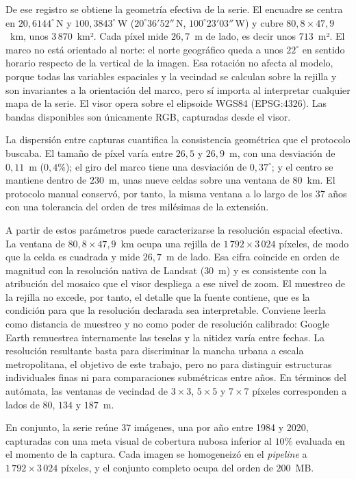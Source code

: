 De ese registro se obtiene la geometría efectiva de la serie. El encuadre se centra en $20{,}6144^\circ$\,N y $100{,}3843^\circ$\,W ($20^\circ 36' 52''$\,N, $100^\circ 23' 03''$\,W) y cubre $80{,}8 \times 47{,}9$~km, unos $3\,870$~km². Cada píxel mide $26{,}7$~m de lado, es decir unos $713$~m². El marco no está orientado al norte: el norte geográfico queda a unos $22^\circ$ en sentido horario respecto de la vertical de la imagen. Esa rotación no afecta al modelo, porque todas las variables espaciales y la vecindad se calculan sobre la rejilla y son invariantes a la orientación del marco, pero sí importa al interpretar cualquier mapa de la serie. El visor opera sobre el elipsoide WGS84 (EPSG:4326). Las bandas disponibles son únicamente RGB, capturadas desde el visor.

La dispersión entre capturas cuantifica la consistencia geométrica que el protocolo buscaba. El tamaño de píxel varía entre $26{,}5$ y $26{,}9$~m, con una desviación de $0{,}11$~m ($0{,}4$\%); el giro del marco tiene una desviación de $0{,}37^\circ$; y el centro se mantiene dentro de $230$~m, unas nueve celdas sobre una ventana de $80$~km. El protocolo manual conservó, por tanto, la misma ventana a lo largo de los 37 años con una tolerancia del orden de tres milésimas de la extensión.

A partir de estos parámetros puede caracterizarse la resolución espacial efectiva. La ventana de $80{,}8 \times 47{,}9$~km ocupa una rejilla de $1\,792 \times 3\,024$ píxeles, de modo que la celda es cuadrada y mide $26{,}7$~m de lado. Esa cifra coincide en orden de magnitud con la resolución nativa de Landsat ($30$~m) y es consistente con la atribución del mosaico que el visor despliega a ese nivel de zoom. El muestreo de la rejilla no excede, por tanto, el detalle que la fuente contiene, que es la condición para que la resolución declarada sea interpretable. Conviene leerla como distancia de muestreo y no como poder de resolución calibrado: Google Earth remuestrea internamente las teselas y la nitidez varía entre fechas. La resolución resultante basta para discriminar la mancha urbana a escala metropolitana, el objetivo de este trabajo, pero no para distinguir estructuras individuales finas ni para comparaciones submétricas entre años. En términos del autómata, las ventanas de vecindad de $3\times3$, $5\times5$ y $7\times7$ píxeles corresponden a lados de $80$, $134$ y $187$~m.

En conjunto, la serie reúne 37 imágenes, una por año entre 1984 y 2020, capturadas con una meta visual de cobertura nubosa inferior al $10$\% evaluada en el momento de la captura. Cada imagen se homogeneizó en el \textit{pipeline} a $1\,792 \times 3\,024$ píxeles, y el conjunto completo ocupa del orden de $200$~MB.

